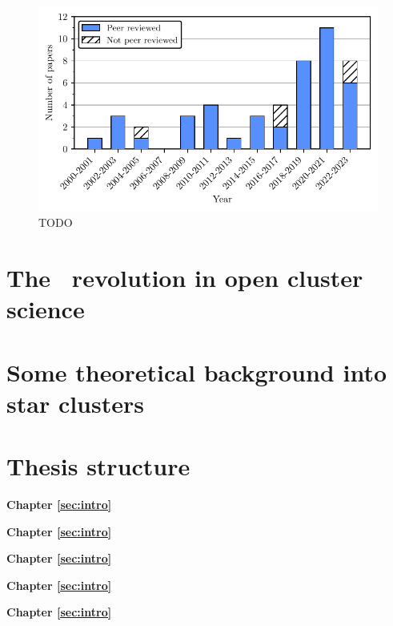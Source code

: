 \begin{figure}[tb]
	\includegraphics[width=\textwidth]{fig/c1/papers.pdf}
	\caption{TODO}
	\label{fig:intro:history:papers}
\end{figure}


\section{The \gaia\ revolution in open cluster science}
\label{sec:intro:gaia}


\section{Some theoretical background into star clusters}
\label{sec:intro:theory}


\section{Thesis structure}
\label{sec:intro:structure}

\textbf{Chapter \ref{sec:intro}} \\[0.2em]
\blindtext

\textbf{Chapter \ref{sec:intro}} \\[0.2em]
\blindtext

\textbf{Chapter \ref{sec:intro}} \\[0.2em]
\blindtext

\textbf{Chapter \ref{sec:intro}} \\[0.2em]
\blindtext

\textbf{Chapter \ref{sec:intro}} \\[0.2em]
\blindtext
